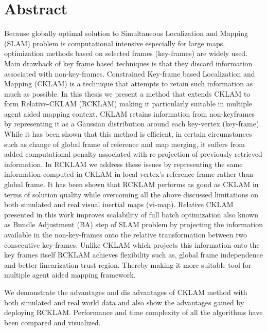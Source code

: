 \chapter*{Abstract}

Because globally optimal solution to Simultaneous Localization and Mapping (SLAM) problem is computational intensive especially for large maps, optimization methods based on selected frames (key-frames) are widely used. Main drawback of key frame based techniques is that they discard information associated with non-key-frames. Constrained Key-frame based Localization and Mapping (CKLAM) is a technique that attempts to retain such information as much as possible. In this thesis we present a method that extends CKLAM to form Relative-CKLAM (RCKLAM) making it particularly suitable in multiple agent aided mapping context. CKLAM retains information from non-keyframes by representing it as a Gaussian distribution around each key-vertex (key-frame). While it has been shown that this method is efficient, in certain circumstances such as change of global frame of reference and map merging, it suffers from added computational penalty associated with re-projection of previously retrieved information. In RCKLAM we address these issues by representing the same information computed in CKLAM in local vertex's reference frame rather than global frame. It has been shown that RCKLAM performs as good as CKLAM in terms of solution quality while overcoming all the above discussed limitations on both simulated and real visual inertial maps (vi-map). Relative CKLAM presented in this work improves scalability of full batch optimization also known as Bundle Adjustment (BA) step of SLAM problem by projecting the information available in the non-key-frames onto the relative transformation between two consecutive key-frames. Unlike CKLAM which projects this information onto the key frames itself RCKLAM achieves flexibility such as, global frame independence and better linearization trust region. Thereby making it more suitable tool for multiple agent aided mapping framework.

We demonstrate the advantages and dis advantages of CKLAM method with both simulated and real world data and also show the advantages gained by deploying RCKLAM. Performance and time complexity of all the algorithms have been compared and visualized. 